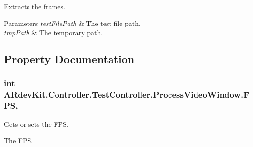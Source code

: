 Extracts the frames. 


\begin{DoxyParams}{Parameters}
{\em test\-File\-Path} & The test file path.\\
\hline
{\em tmp\-Path} & The temporary path.\\
\hline
\end{DoxyParams}


\subsection{Property Documentation}
\hypertarget{class_a_rdev_kit_1_1_controller_1_1_test_controller_1_1_process_video_window_a8f9c4bafd5143ae34f81c5cc11b9a518}{
\subsubsection[{F\-P\-S}]{\setlength{\rightskip}{0pt plus 5cm}int A\-Rdev\-Kit.\-Controller.\-Test\-Controller.\-Process\-Video\-Window.\-F\-P\-S\hspace{0.3cm}{\ttfamily [get]}, {\ttfamily [set]}}}\label{class_a_rdev_kit_1_1_controller_1_1_test_controller_1_1_process_video_window_a8f9c4bafd5143ae34f81c5cc11b9a518}


Gets or sets the F\-P\-S. 

The F\-P\-S. 